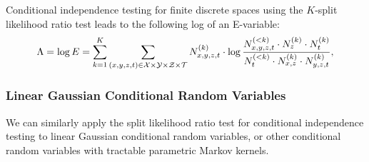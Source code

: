 Conditional independence testing for finite discrete spaces using the $K$-split likelihood ratio test
 leads to the following log of an E-variable:
\begin{align*}
    \Lambda = \log E = \sum_{k=1}^K \sum_{(x,y,z,t) \in \mathcal{X}\times\mathcal{Y}\times\mathcal{Z}\times\mathcal{T}}  N^{(k)}_{x,y,z,t} \cdot  \log \frac{N_{x,y,z,t}^{(<k)} \cdot N_z^{(k)} \cdot N_t^{(k)}}{N_{t}^{(<k)} \cdot N_{x,z}^{(k)} \cdot N_{y,z,t}^{(k)}},
\end{align*}


\subsubsection{Linear Gaussian Conditional Random Variables}

We can similarly apply the split likelihood ratio test for conditional independence testing 
to linear Gaussian conditional random variables, 
or other conditional random variables with tractable parametric Markov kernels.

